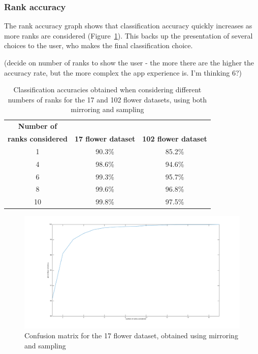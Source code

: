 \documentclass[11pt, a4paper]{report}
\begin{document}
\subsubsection{Rank accuracy}

The rank accuracy graph shows that classification accuracy quickly increases as more ranks are considered (Figure~\ref{table:rank}). This backs up the presentation of several choices to the user, who makes the final classification choice. 


(decide on number of ranks to show the user - the more there are the higher the accuracy rate, but the more complex the app experience is. I'm thinking 6?)  





\begin{table}[h]
\centering 
\renewcommand{\arraystretch}{1.3}
\begin{tabular}{c|cc}
  {\bf Number of}\\ {\bf ranks considered} & {\bf 17 flower dataset} & {\bf 102 flower dataset} \\
  \hline
  1 & 90.3\% & 85.2\% \\
  4 & 98.6\% & 94.6\% \\
  6 & 99.3\% & 95.7\% \\
  8 & 99.6\% & 96.8\% \\
  10 & 99.8\% & 97.5\% 
\end{tabular}
\renewcommand{\arraystretch}{1}
\caption{Classification accuracies obtained when considering different numbers of ranks for the 17 and 102 flower datasets, using both mirroring and sampling}
\label{table:rank}
\end{table}

\begin{figure}[hbt]
	\centering
  \includegraphics[totalheight=8cm]{img/19.png}
  \caption{Confusion matrix for the 17 flower dataset, obtained using mirroring and sampling}
  \label{img:19}
\end{figure}
\end{document}
